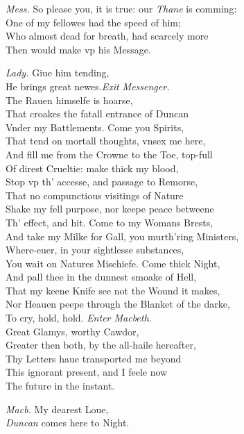 \documentclass[12pt]{sides}
\newcommand{\clStageDir}[1]{\hspace*{\fill}\textit{#1}\hspace*{\fill}}
\newcommand{\dia}[1]{\hskip 15pt\textit{#1}\hskip 6pt}
\begin{document}
\begin{multicols}{2}
            \dia{Mess.} So please you, it is true: our \textit{Thane} is comming: \\ One of my fellowes had the speed of him; \\ Who almost dead for breath, had scarcely more \\ Then would make vp his Message.

            \dia{Lady.} Giue him tending, \\ He brings great newes.\clStageDir{Exit Messenger.} \\ The Rauen himselfe is hoarse, \\ That croakes the fatall entrance of Duncan \\ Vnder my Battlements. Come you Spirits, \\ That tend on mortall thoughts, vnsex me here, \\ And fill me from the Crowne to the Toe, top-full \\ Of direst Crueltie: make thick my blood, \\ Stop vp th' accesse, and passage to Remorse, \\ That no compunctious visitings of Nature \\ Shake my fell purpose, nor keepe peace betweene \\ Th' effect, and hit. Come to my Womans Brests, \\ And take my Milke for Gall, you murth'ring Ministers, \\ Where-euer, in your sightlesse substances, \\ You wait on Natures Mischiefe. Come thick Night, \\ And pall thee in the dunnest smoake of Hell, \\ That my keene Knife see not the Wound it makes, \\ Nor Heauen peepe through the Blanket of the darke, \\ To cry, hold, hold. \hfill \textit{Enter Macbeth.} \hspace{30pt} \\ Great Glamys, worthy Cawdor, \\ Greater then both, by the all-haile hereafter, \\ Thy Letters haue transported me beyond \\ This ignorant present, and I feele now \\ The future in the instant.

            \dia{Macb.} My dearest Loue, \\ \textit{Duncan} comes here to Night.


\end{multicols}
\end{document}
